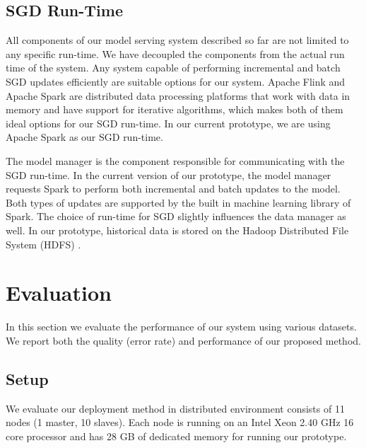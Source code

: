 \documentclass[10pt,conference,letterpaper]{IEEEtran}
\begin{document}
\subsection{SGD Run-Time} 
All components of our model serving system described so far are not limited to any specific run-time.
We have decoupled the components from the actual run time of the system.
Any system capable of performing incremental and batch SGD updates efficiently are suitable options for our system.
Apache Flink \cite{carbone2015apache} and Apache Spark \cite{zaharia2010spark} are distributed data processing platforms that work with data in memory and have support for iterative algorithms, which makes both of them ideal options for our SGD run-time.
In our current prototype, we are using Apache Spark \cite{zaharia2010spark} as our SGD run-time.

The model manager is the component responsible for communicating with the SGD run-time.
In the current version of our prototype, the model manager requests Spark to perform both incremental and batch updates to the model.
Both types of updates are supported by the built in machine learning library of Spark.
The choice of run-time for SGD slightly influences the data manager as well.
In our prototype, historical data is stored on the Hadoop Distributed File System (HDFS) \cite{shvachko2010hadoop}.

\section{Evaluation} \label{evaluation} 
In this section we evaluate the performance of our system using various datasets. 
We report both the quality (error rate) and performance of our proposed method. 

\subsection{Setup}\label{subsec:setup}
We evaluate our deployment method in distributed environment consists of 11 nodes (1 master, 10 slaves).
Each node is running on an Intel Xeon 2.40 GHz 16 core processor and has 28 GB of dedicated memory for running our prototype.
\end{document}
